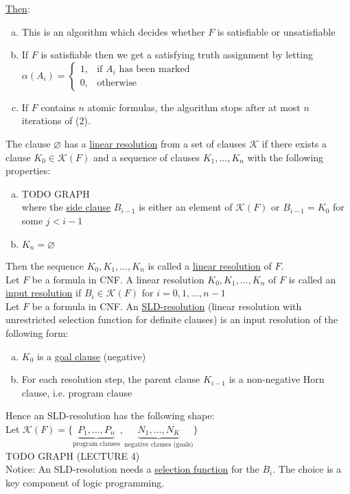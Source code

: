 \documentclass[a4paper]{article}
\newcommand{\ul}{\underline}
\begin{document}
\ul{Then}:
\begin{enumerate}[(a)]
	\item This is an algorithm which decides whether $F$ is satisfiable or unsatisfiable
	\item If $F$ is satisfiable then we get a satisfying truth assignment by letting $\alpha(A_i)=\begin{cases}
	1, & \text{if }A_i\text{ has been marked}\\
	0, & \text{otherwise}
	\end{cases}$
	\item If $F$ contains $n$ atomic formulas, the algorithm stops after at most $n$ iterations of (2).
\end{enumerate}
The clause $\varnothing$ has a \ul{linear resolution} from a set of clauses $\mathcal{K}$ if there exists a clause $K_0\in\mathcal{K}(F)$ and a sequence of clauses $K_1,\dots,K_n$ with the following properties:
\begin{enumerate}[(a)]
	\item TODO GRAPH\\
	where the \ul{side clause} $B_{i-1}$ is either an element of $\mathcal{K}(F)$ or $B_{i-1}=K_0$ for some $j<i-1$
	\item $K_n=\varnothing$
\end{enumerate}
Then the sequence $K_0,K_1,\dots,K_n$ is called a \ul{linear resolution} of $F$.\\
Let $F$ be a formula in CNF. A linear resolution $K_0,K_1,\dots,K_n$ of $F$ is called an \ul{input resolution} if $B_i\in\mathcal{K}(F)$ for $i=0,1,\dots,n-1$\\
Let $F$ be a formula in CNF. An \ul{SLD-resolution} (linear resolution with unrestricted selection function for definite clauses) is an input resolution of the following form:
\begin{enumerate}[(a)]
	\item $K_0$ is a \ul{goal clause} (negative)
	\item For each resolution step, the parent clause $K_{i-1}$ is a non-negative Horn clause, i.e. program clause
\end{enumerate}
Hence an SLD-resolution has the following shape:\\
Let $\mathcal{K}(F)=\{\underbrace{P_1,\dots,P_n}_{\text{program clauses}},\underbrace{N_1,\dots,N_K}_{\text{negative clauses (goals)}}\}$\\
TODO GRAPH (LECTURE 4)\\
Notice: An SLD-resolution needs a \ul{selection function} for the $B_i$. The choice is a key component of logic programming.\\
\end{document}
